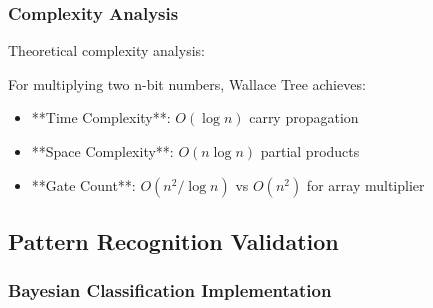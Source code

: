 \subsubsection{Complexity Analysis}

Theoretical complexity analysis:

\begin{theorem}
For multiplying two n-bit numbers, Wallace Tree achieves:

\begin{itemize}
    \item **Time Complexity**: $O(\log n)$ carry propagation
    \item **Space Complexity**: $O(n \log n)$ partial products
    \item **Gate Count**: $O(n^2 / \log n)$ vs $O(n^2)$ for array multiplier
\end{itemize}
\end{theorem}

\subsection{Pattern Recognition Validation}

\subsubsection{Bayesian Classification Implementation}

